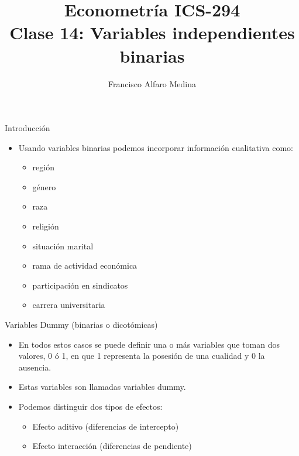 \documentclass{beamer}
\title[ICS-162]{Econometría ICS-294\\ \small{Clase 14: Variables independientes binarias }}
\author{Francisco Alfaro Medina}
\institute[USM]
{Universidad Técnica Federico Santa María\\ %
	\medskip
	\textit{} %
	
}
\date{}
\begin{document}
	
\begin{frame}
	\titlepage %


\end{frame}

\begin{frame}{Introducción}
    \begin{itemize}
        
        \item Usando variables binarias podemos incorporar información cualitativa como:
        \begin{itemize}
            \item región
            \item género
            \item raza
            \item religión
            \item situación marital
            \item rama de actividad económica
            \item participación en sindicatos
            \item carrera universitaria
        \end{itemize}
        
    \end{itemize}
\end{frame}
\begin{frame}{Variables Dummy (binarias o dicotómicas)}
    \begin{itemize}
        \item En todos estos casos se puede definir una o más variables que toman dos valores, 0 ó 1, en que 1 representa la posesión de una cualidad y 0 la ausencia.
        \item Estas variables son llamadas variables dummy.
        \item Podemos distinguir dos tipos de efectos:
        \begin{itemize}
            \item Efecto aditivo (diferencias de intercepto)
            \item Efecto interacción (diferencias de pendiente)
        \end{itemize}
    \end{itemize}
\end{frame}
\end{document}
